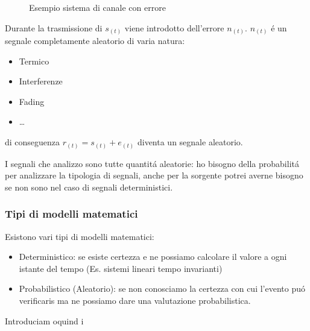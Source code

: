         \begin{figure}[H]
            \centering
            \label{fig:Sistema di comunicazione canale con errore}
            \caption{Esempio sistema di canale con errore}
        \end{figure}
        Durante la trasmissione di $s_{(t)}$ viene introdotto dell'errore $n_{(t)}$. $n_{(t)}$ é un segnale completamente aleatorio di varia 
        natura:
        \begin{itemize}
            \item {Termico}
            \item {Interferenze}
            \item {Fading}
            \item {\dots}
        \end{itemize}
        \noindent di conseguenza $r_{(t)} = s_{(t)}+e_{(t)}$ diventa un segnale aleatorio.

        I segnali che analizzo sono tutte quantitá aleatorie: ho bisogno della probabilitá per analizzare la tipologia di segnali, anche per la sorgente
        potrei averne bisogno se non sono nel caso di segnali deterministici.

        \subsubsection{Tipi di modelli matematici}
            Esistono vari tipi di modelli matematici:
            \begin{itemize}
                \item {Deterministico: se esiste certezza e ne possiamo calcolare il valore a ogni istante del tempo (Es. sistemi lineari tempo invarianti)}
                \item {Probabilistico (Aleatorio): se non conosciamo la certezza con cui l'evento puó verificaris ma ne possiamo dare una valutazione probabilistica.}
            \end{itemize}
            Introduciam oquind i
